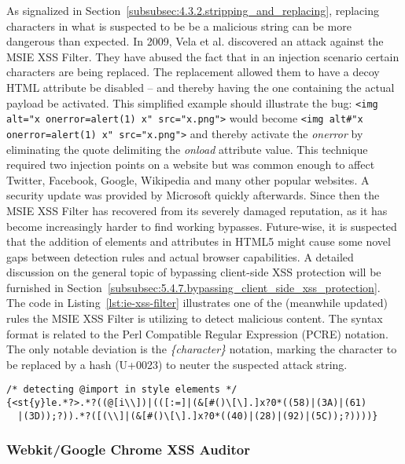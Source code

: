     As signalized in Section~\ref{subsubsec:4.3.2.stripping_and_replacing}, replacing characters in what is suspected to be be a malicious string can be more dangerous than expected. In 2009, Vela et al. discovered an attack against the MSIE XSS Filter. They have abused the fact that in an injection scenario certain characters are being replaced. The replacement allowed them to have a decoy HTML attribute be disabled -- and thereby having the one containing the actual payload be activated. This simplified example should illustrate the bug: \texttt{<img alt="x onerror=alert(1) x" src="x.png">} would become \texttt{<img alt\#"x onerror=alert(1) x" src="x.png">} and thereby activate the \textit{onerror} by eliminating the quote delimiting the \textit{onload} attribute value. This technique required two injection points on a website but was common enough to affect Twitter, Facebook, Google, Wikipedia and many other popular websites. A security update was provided by Microsoft quickly afterwards. Since then the 
MSIE XSS Filter has recovered from its severely damaged reputation, as it has become increasingly harder to find working bypasses. Future-wise, it is suspected that the addition of elements and attributes in HTML5 might cause some novel gaps between detection rules and actual browser capabilities. A detailed discussion on the general topic of bypassing client-side XSS protection will be furnished in Section~\ref{subsubsec:5.4.7.bypassing_client_side_xss_protection}. The code in Listing~\ref{lst:ie-xss-filter} illustrates one of the (meanwhile updated) rules the MSIE XSS Filter is utilizing to detect malicious content. The syntax format is related to the Perl Compatible Regular Expression (PCRE) notation. The only notable deviation is the \textit{\{character\}} notation, marking the character to be replaced by a hash (U+0023) to neuter the suspected attack string.  

\begin{lstlisting}[captionpos=b,caption=MSIE XSS Filter rule example code; Extracted in 2009 by analyzing the containing DLL file,label=lst:ie-xss-filter]
/* detecting @import in style elements */
{<st{y}le.*?>.*?((@[i\\])|(([:=]|(&[#()\[\].]x?0*((58)|(3A)|(61)
  |(3D));?)).*?([(\\]|(&[#()\[\].]x?0*((40)|(28)|(92)|(5C));?))))} 
\end{lstlisting}

    \subsubsection{Webkit/Google Chrome XSS Auditor}
    \label{subsubsec:4.4.3.chrome_xss_auditor}

